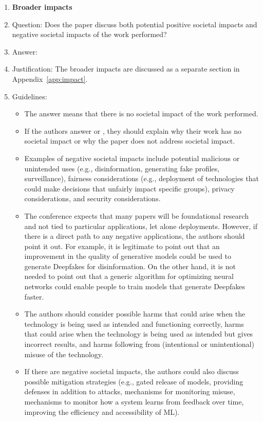 \documentclass{article}
\begin{document}
\begin{enumerate}
\item {\bf Broader impacts}
    \item[] Question: Does the paper discuss both potential positive societal impacts and negative societal impacts of the work performed?
    \item[] Answer: \answerYes{} %
    \item[] Justification: The broader impacts are discussed as a separate section in Appendix~\ref{app:impact}.
    \item[] Guidelines:
    \begin{itemize}
        \item The answer \answerNA{} means that there is no societal impact of the work performed.
        \item If the authors answer \answerNA{} or \answerNo, they should explain why their work has no societal impact or why the paper does not address societal impact.
        \item Examples of negative societal impacts include potential malicious or unintended uses (e.g., disinformation, generating fake profiles, surveillance), fairness considerations (e.g., deployment of technologies that could make decisions that unfairly impact specific groups), privacy considerations, and security considerations.
        \item The conference expects that many papers will be foundational research and not tied to particular applications, let alone deployments. However, if there is a direct path to any negative applications, the authors should point it out. For example, it is legitimate to point out that an improvement in the quality of generative models could be used to generate Deepfakes for disinformation. On the other hand, it is not needed to point out that a generic algorithm for optimizing neural networks could enable people to train models that generate Deepfakes faster.
        \item The authors should consider possible harms that could arise when the technology is being used as intended and functioning correctly, harms that could arise when the technology is being used as intended but gives incorrect results, and harms following from (intentional or unintentional) misuse of the technology.
        \item If there are negative societal impacts, the authors could also discuss possible mitigation strategies (e.g., gated release of models, providing defenses in addition to attacks, mechanisms for monitoring misuse, mechanisms to monitor how a system learns from feedback over time, improving the efficiency and accessibility of ML).
    \end{itemize}
    

\end{enumerate}
\end{document}
